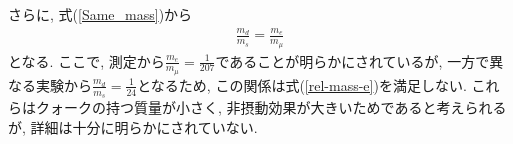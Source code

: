 さらに, 式(\ref{Same_mass})から
\begin{align}
  \frac{m_d}{m_s} = \frac{m_e}{m_\mu} \label{rel-mass-e}
\end{align}
となる.
ここで, 測定から$\frac{m_e}{m_\mu}=\frac{1}{207}$であることが明らかにされているが, 一方で異なる実験から$\frac{m_d}{m_s} = \frac{1}{24}$となるため, この関係は式(\ref{rel-mass-e})を満足しない\cite{dominguezDeterminationQuarkMass1979,dominguezZeroMassQuarksU11978,langackerLightquarkMassSpectrum1979,langackerQuarkMassDifferences1979,weinbergFestschriftIIRabi1977}.
これらはクォークの持つ質量が小さく, 非摂動効果が大きいためであると考えられるが, 詳細は十分に明らかにされていない.

